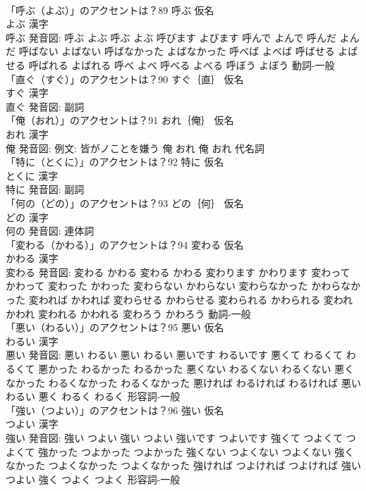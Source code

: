 \documentclass[8pt]{extreport}
\begin{document}
\begin{CJK}{UTF8}{min}
\\	「呼ぶ（よぶ）」のアクセントは？89	呼ぶ 仮名　
\\	よぶ 漢字　
\\	呼ぶ 発音図:	呼ぶ よぶ		呼ぶ よぶ 呼びます よびます 呼んで よんで 呼んだ よんだ 呼ばない よばない 呼ばなかった よばなかった 呼べば よべば 呼ばせる よばせる 呼ばれる よばれる 呼べ よべ 呼べる よべる 呼ぼう よぼう				動詞-一般 
\\	「直ぐ（すぐ）」のアクセントは？90	すぐ｛直｝ 仮名　
\\	すぐ 漢字　
\\	直ぐ 発音図:							副詞 
\\	「俺（おれ）」のアクセントは？91	おれ｛俺｝ 仮名　
\\	おれ 漢字　
\\	俺 発音図: 例文: 皆がノことを嫌う	俺 おれ		俺 おれ				代名詞 
\\	「特に（とくに）」のアクセントは？92	特に 仮名　
\\	とくに 漢字　
\\	特に 発音図:							副詞 
\\	「何の（どの）」のアクセントは？93	どの｛何｝ 仮名　
\\	どの 漢字　
\\	何の 発音図:							連体詞 
\\	「変わる（かわる）」のアクセントは？94	変わる 仮名　
\\	かわる 漢字　
\\	変わる 発音図:	変わる かわる		変わる かわる 変わります かわります 変わって かわって 変わった かわった 変わらない かわらない 変わらなかった かわらなかった 変われば かわれば 変わらせる かわらせる 変わられる かわられる 変われ かわれ 変われる かわれる 変わろう かわろう				動詞-一般 
\\	「悪い（わるい）」のアクセントは？95	悪い 仮名　
\\	わるい 漢字　
\\	悪い 発音図:	悪い わるい		悪い わるい 悪いです わるいです 悪くて わるくて わるくて 悪かった わるかった わるかった 悪くない わるくない わるくない 悪くなかった わるくなかった わるくなかった 悪ければ わるければ わるければ 悪い わるい 悪く わるく わるく				形容詞-一般 
\\	「強い（つよい）」のアクセントは？96	強い 仮名　
\\	つよい 漢字　
\\	強い 発音図:	強い つよい		強い つよい 強いです つよいです 強くて つよくて つよくて 強かった つよかった つよかった 強くない つよくない つよくない 強くなかった つよくなかった つよくなかった 強ければ つよければ つよければ 強い つよい 強く つよく つよく				形容詞-一般 

\end{CJK}
\end{document}
